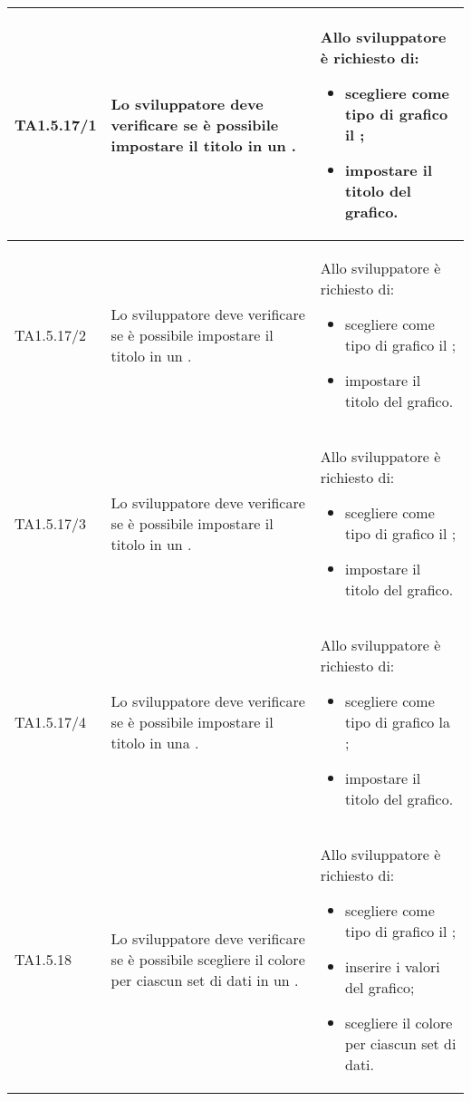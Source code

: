 \begin{longtabu}{| X[0.5] | X | X |}
	TA1.5.17/1 & Lo sviluppatore deve verificare se è possibile impostare il titolo in un .

		& Allo sviluppatore è richiesto di:
		\begin{itemize}
			\item scegliere come tipo di grafico il ;
			\item impostare il titolo del grafico.
		\end{itemize}
\\ \hline

	TA1.5.17/2 & Lo sviluppatore deve verificare se è possibile impostare il titolo in un .

		& Allo sviluppatore è richiesto di:
		\begin{itemize}
			\item scegliere come tipo di grafico il ;
			\item impostare il titolo del grafico.
		\end{itemize}
\\ \hline

	TA1.5.17/3 & Lo sviluppatore deve verificare se è possibile impostare il titolo in un .

		& Allo sviluppatore è richiesto di:
		\begin{itemize}
			\item scegliere come tipo di grafico il ;
			\item impostare il titolo del grafico.
		\end{itemize}
\\ \hline

	TA1.5.17/4 & Lo sviluppatore deve verificare se è possibile impostare il titolo in una .

		& Allo sviluppatore è richiesto di:
		\begin{itemize}
			\item scegliere come tipo di grafico la ;
			\item impostare il titolo del grafico.
		\end{itemize}
\\ \hline

	TA1.5.18 & Lo sviluppatore deve verificare se è possibile scegliere il colore per ciascun set di dati in un .

		& Allo sviluppatore è richiesto di:
		\begin{itemize}
			\item scegliere come tipo di grafico il ;
			\item inserire i valori del grafico;
			\item scegliere il colore per ciascun set di dati.
		\end{itemize}
\\ \hline


\end{longtabu}
